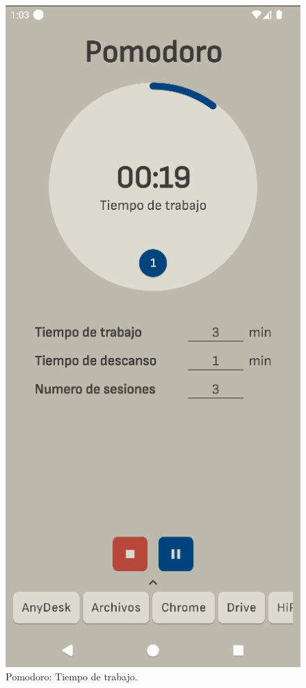 \begin{figure}[ht!]
  \centering
  \captionsetup{justification=centering}
  \begin{minipage}{0.43\textwidth}
    \caption{Pomodoro: Tiempo de trabajo.}
    \label{fig:pomodoro:tiempo_trabajo}
    \centering
    \includegraphics[width=\textwidth]{Figuras/secciones/pomodoro_tiempo_trabajo.png}

\end{minipage}
\end{figure}
